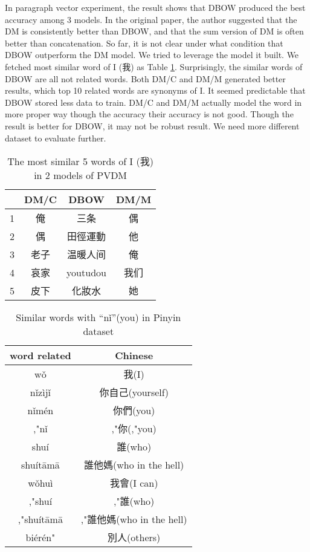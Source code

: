 In paragraph vector experiment, the result shows that DBOW produced the best accuracy among 3 models. In the original paper, the author suggested that the DM is consistently better than DBOW, and that the sum version of DM is often better than concatenation. 
So far, it is not clear under what condition that DBOW outperform the DM model. We tried to leverage the model it built. 
We fetched most similar word of I (我) as Table \ref{table:doc2vec}. Surprisingly, the similar words of DBOW are all not related words. 
Both DM/C and DM/M generated better results, which top 10 related words are synonyms of I.
It seemed predictable that DBOW stored less data to train. DM/C and DM/M actually model the word in more proper way though the accuracy their accuracy is not good.
Though the result is better for DBOW, it may not be robust result. We need more different dataset to evaluate further.
\begin{CJK}{UTF8}{gbsn}
\begin{table}[]
\centering
\caption{The most similar 5 words of I (我) in 2 models of PVDM}
\label{table:doc2vec}
\begin{tabular}{|c|c|c|c|}
\hline
      & DM/C & DBOW & DM/M \\
\hline
1 & 俺 &  三条  & 偶\\
2 & 偶  & 田徑運動 & 他\\
3 & 老子  & 温暖人间 & 俺\\
4 & 哀家  & youtudou & 我们\\
5 & 皮下  & 化妝水 & 她 \\
\hline
\end{tabular}
\end{table}
\end{CJK}

\begin{table}[]
\centering
\caption{Similar words with \enquote{nǐ}(you) in Pinyin dataset}
\label{table:py_similar}
\begin{tabular}{|c|c|}
\hline
 word related  & Chinese  \\
\hline
wǒ         &   我(I)  \\
nǐzìjǐ     &   你自己(yourself) \\   
nǐmén      &   你們(you)   \\
,"nǐ       &   ,"你(,"you)  \\ 
shuí       &   誰(who)   \\
shuítāmā   &   誰他媽(who in the hell)\\   
wǒhuì      &   我會(I can)   \\
,"shuí     &   ,"誰(who)   \\
,"shuítāmā &   ,"誰他媽(who in the hell)\\   
biérén"    &   別人(others)\\
\hline
\end{tabular}
\end{table}


